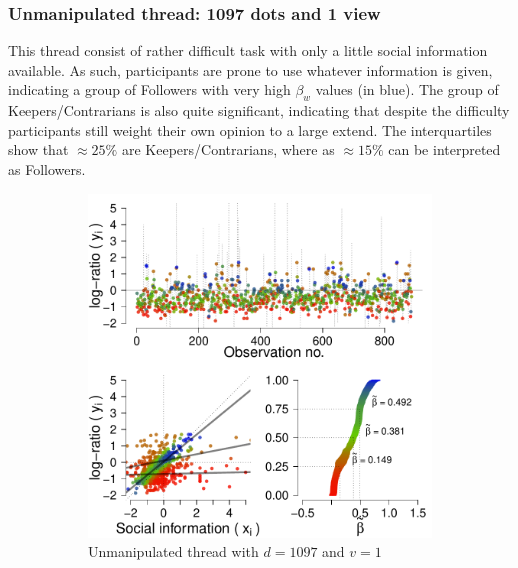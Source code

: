 \documentclass[9pt,twocolumn,twoside,lineno]{pnas-new}
\begin{document}
\subsubsection*{Unmanipulated thread: 1097 dots and 1 view}
This thread consist of rather difficult task with only a little social information available. As such, participants are prone to use whatever information is given, indicating a group of Followers with very high $\beta_w$ values (in blue). The group of Keepers/Contrarians is also quite significant, indicating that despite the difficulty participants still weight their own opinion to a large extend. The interquartiles show that  $\approx25\%$ are Keepers/Contrarians, where as $\approx15\%$ can be interpreted as Followers.

\begin{figure}[!ht]
	\centering
	\begin{subfigure}[t]{.48\linewidth}
		\centering
		\includegraphics[width=1\linewidth]{../plots/h10971.pdf}
		\caption{Unmanipulated thread with $d=1097$ and $v=1$}
		\label{fig: ud1097v1}
	\end{subfigure}
	\begin{subfigure}[t]{.48\linewidth}
		\centering

\end{subfigure}
\end{figure}
\end{document}
